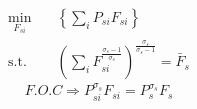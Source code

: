 \begin{equation*}
    \begin{split}
        \min_{F_{si}} & \quad \left\{
    \sum_{i} P_{si} F_{si}	
    \right\}\\
    \text{s.t.} & \quad \left(\sum_{i} F_{si}^{\frac{\sigma_s-1}{\sigma_s}}\right)^{\frac{\sigma_s}{\sigma_s-1}} = \bar{F}_s
    \end{split}
\end{equation*}
\begin{equation*}
    F.O.C \Rightarrow P_{si}^{\sigma_s} F_{si} = P_s^{\sigma_s} {F}_s
\end{equation*}